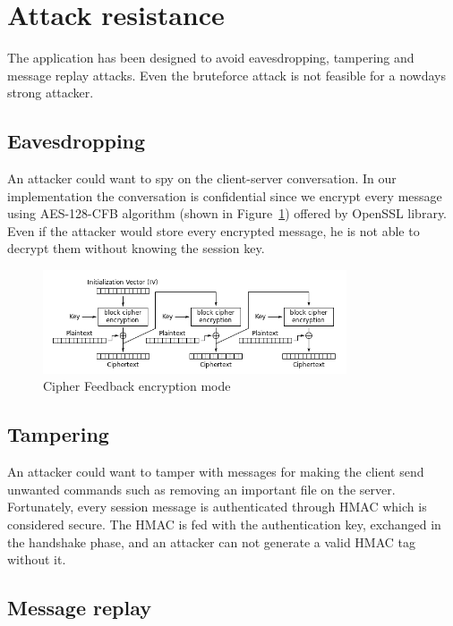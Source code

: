 \documentclass[a4paper,12pt]{article}
\begin{document}
\section{Attack resistance}

The application has been designed to avoid eavesdropping, tampering and message replay attacks. Even the bruteforce attack is not feasible for a nowdays strong attacker.

\subsection{Eavesdropping}
An attacker could want to spy on the client-server conversation. In our implementation the conversation is confidential since we encrypt every message using AES-128-CFB algorithm (shown in Figure~\ref{img:cfb-enc-mode}) offered by OpenSSL library.
Even if the attacker would store every encrypted message, he is not able to decrypt them without knowing the session key.

\begin{figure}[H]
\centering
\includegraphics[width=0.8\textwidth]{img/CFB-enc-mode}
\caption{Cipher Feedback encryption mode}
\label{img:cfb-enc-mode}
\end{figure}


\subsection{Tampering}

An attacker could want to tamper with messages for making the client send unwanted commands such as removing an important file on the server. Fortunately, every session message is authenticated through HMAC which is considered secure. The HMAC is fed with the authentication key, exchanged in the handshake phase, and an attacker can not generate a valid HMAC tag without it. 

\subsection{Message replay}
\end{document}
